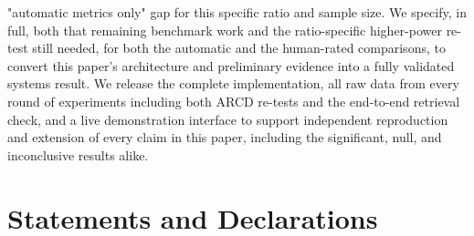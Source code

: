 "automatic metrics only" gap for this specific ratio and sample size. We specify, in full, both that remaining benchmark work and the ratio-specific higher-power re-test still needed, for both the automatic and the human-rated comparisons, to convert this paper's architecture and preliminary evidence into a fully validated systems result. We release the complete implementation, all raw data from every round of experiments including both ARCD re-tests and the end-to-end retrieval check, and a live demonstration interface to support independent reproduction and extension of every claim in this paper, including the significant, null, and inconclusive results alike.

\section*{Statements and Declarations}
